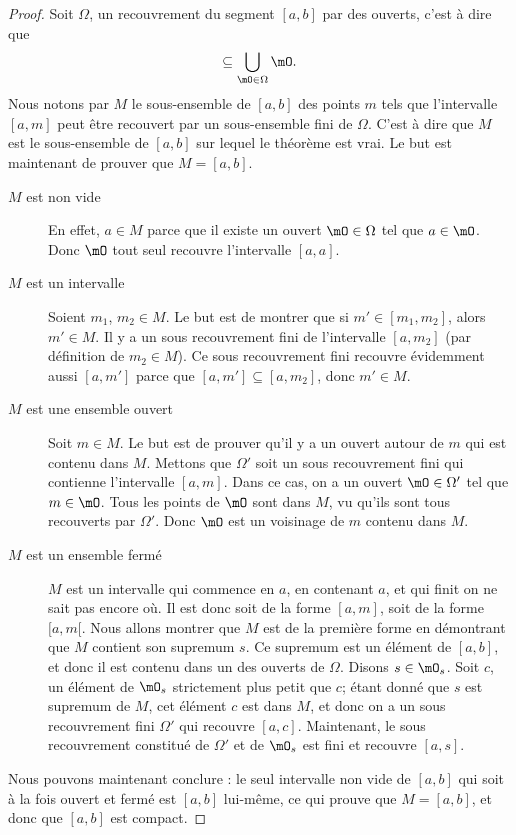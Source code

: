 \begin{proof}
    Soit $\Omega$, un recouvrement du segment $[a,b]$ par des ouverts, c'est à dire que
    \begin{equation}
        [a,b]\subseteq\bigcup_{\mO\in\Omega}\mO.
    \end{equation}
    Nous notons par $M$ le sous-ensemble de $[a,b]$ des points $m$ tels que l'intervalle $[a,m]$ peut être recouvert par un sous-ensemble fini de $\Omega$. C'est à dire que $M$ est le sous-ensemble de $[a,b]$ sur lequel le théorème est vrai. Le but est maintenant de prouver que $M=[a,b]$.
    \begin{description}
        \item[$M$ est non vide] En effet, $a\in M$ parce que il existe un ouvert $\mO\in\Omega$ tel que $a\in\mO$. Donc $\mO$ tout seul recouvre l'intervalle $[a,a]$. 
        \item[$M$ est un intervalle] Soient $m_1$, $m_2\in M$. Le but est de montrer que si $m'\in[m_1,m_2]$, alors $m'\in M$. Il y a un sous recouvrement fini de l'intervalle $[a,m_2]$ (par définition de $m_2\in M$). Ce sous recouvrement fini recouvre évidemment aussi $[a,m']$ parce que $[a,m']\subseteq [a,m_2]$, donc $m'\in M$.
        \item[$M$ est une ensemble ouvert] Soit $m\in M$. Le but est de prouver qu'il y a un ouvert autour de $m$ qui est contenu dans $M$. Mettons que $\Omega'$ soit un sous recouvrement fini qui contienne l'intervalle $[a,m]$. Dans ce cas, on a un ouvert $\mO\in\Omega'$ tel que $m\in\mO$. Tous les points de $\mO$ sont dans $M$, vu qu'ils sont tous recouverts par $\Omega'$. Donc $\mO$ est un voisinage de $m$ contenu dans $M$.
        \item[$M$ est un ensemble fermé] $M$ est un intervalle qui commence en $a$, en contenant $a$, et qui finit on ne sait pas encore où. Il est donc soit de la forme $[a,m]$, soit de la forme $[a,m[$. Nous allons montrer que $M$ est de la première forme en démontrant que $M$ contient son supremum $s$. Ce supremum est un élément de $[a,b]$, et donc il est contenu dans un des ouverts de $\Omega$. Disons $s\in\mO_s$. Soit $c$, un élément de $\mO_s$ strictement plus petit que $c$; étant donné que $s$ est supremum de $M$, cet élément $c$ est dans $M$, et donc on a un sous recouvrement fini $\Omega'$ qui recouvre $[a,c]$. Maintenant, le sous recouvrement constitué de $\Omega'$ et de $\mO_s$ est fini et recouvre $[a,s]$.
    \end{description}
    Nous pouvons maintenant conclure : le seul intervalle non vide de $[a,b]$ qui soit à la fois ouvert et fermé est $[a,b]$ lui-même, ce qui prouve que $M=[a,b]$, et donc que $[a,b]$ est compact.
\end{proof}

